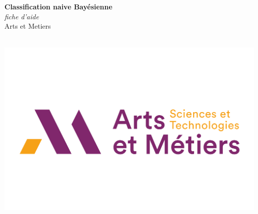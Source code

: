 \documentclass[a0,portrait]{a0poster}
\begin{document}


\begin{minipage}[b]{0.75\linewidth}
\veryHuge \color{NavyBlue} \textbf{Classification naive Bayésienne} \color{Black}\\ %
\Huge\textit{fiche d'aide}\\[2cm] %
\huge Arts et Metiers\\[0.4cm] %
\\
\end{minipage}
%
\begin{minipage}[b]{0.25\linewidth}
\includegraphics[width=20cm]{logo.png}\\
\end{minipage}

\vspace{1cm} %


\end{document}
